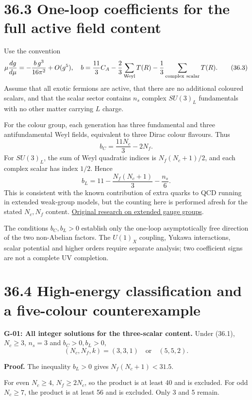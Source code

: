 \documentclass[
  11pt,
  oneside]{book}
\begin{document}
\section{36.3 One-loop coefficients for the full active field content}

Use the convention \[
\mu\frac{dg}{d\mu}=-\frac{b\,g^3}{16\pi^2}+O(g^5),\quad
b=\frac{11}{3}C_A-\frac23\sum_{\rm Weyl}T(R)
-\frac13\sum_{\rm complex\ scalar}T(R).
\tag{36.3}
\] Assume that all exotic fermions are active, that there are no
additional coloured scalars, and that the scalar sector contains \(n_s\)
complex \(SU(3)_L\) fundamentals with no other matter carrying \(L\)
charge.

For the colour group, each generation has three fundamental and three
antifundamental Weyl fields, equivalent to three Dirac colour flavours.
Thus \[
b_C=\frac{11N_c}{3}-2N_f.
\tag{36.4}
\] For \(SU(3)_L\), the sum of Weyl quadratic indices is
\(N_f(N_c+1)/2\), and each complex scalar has index \(1/2\). Hence \[
b_L=11-\frac{N_f(N_c+1)}3-\frac{n_s}{6}.
\tag{36.5}
\] This is consistent with the known contribution of extra quarks to QCD
running in extended weak-group models, but the counting here is
performed afresh for the stated \(N_c,N_f\) content.
\href{https://arxiv.org/abs/1205.4483}{Original research on extended
gauge groups}.

The conditions \(b_C,b_L>0\) establish only the one-loop asymptotically
free direction of the two non-Abelian factors. The \(U(1)_X\) coupling,
Yukawa interactions, scalar potential and higher orders require separate
analysis; two coefficient signs are not a complete UV completion.

\section{36.4 High-energy classification and a five-colour
counterexample}

\label{g-01}{}

\textbf{G-01: All integer solutions for the three-scalar content.} Under
(36.1), \(N_c\ge3\), \(n_s=3\) and \(b_C>0,b_L>0\), \[
(N_c,N_f,k)=(3,3,1)\quad\text{or}\quad(5,5,2).
\tag{36.6}
\]

\textbf{Proof.} The inequality \(b_L>0\) gives \(N_f(N_c+1)<31.5\).

For even \(N_c\ge4\), \(N_f\ge2N_c\), so the product is at least 40 and
is excluded. For odd \(N_c\ge7\), the product is at least 56 and is
excluded. Only 3 and 5 remain.
\end{document}
